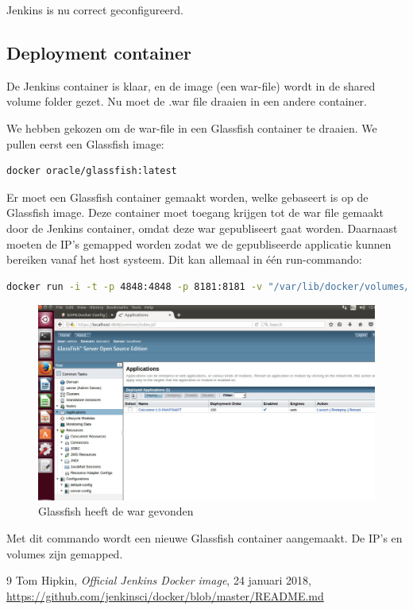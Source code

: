 \documentclass[12pt]{article}
\begin{document}
\noindent Jenkins is nu correct geconfigureerd.

\subsection{Deployment container}
\noindent De Jenkins container is klaar, en de image (een war-file) wordt in de shared volume folder gezet. Nu moet de .war file draaien in een andere container.

We hebben gekozen om de war-file in een Glassfish container te draaien. We pullen eerst een Glassfish image: 

\begin{lstlisting}[language=Bash]
docker oracle/glassfish:latest
\end{lstlisting}

\noindent Er moet een Glassfish container gemaakt worden, welke gebaseert is op de Glassfish image. Deze container moet toegang krijgen tot de war file gemaakt door de Jenkins container, omdat deze war gepubliseert gaat worden. Daarnaast moeten de IP's gemapped worden zodat we de gepubliseerde applicatie kunnen bereiken vanaf het host systeem. Dit kan allemaal in één run-commando:

\begin{lstlisting}[language=Bash]
docker run -i -t -p 4848:4848 -p 8181:8181 -v "/var/lib/docker/volumes/jenkins_home/_data/workspace/SOP6 Docker/target":/glassfish5/glassfish/domains/domain1/autodeploy oracle/glassfish:latest
\end{lstlisting}

\begin{figure}[H]
	\begin{center}
		\includegraphics[width=1.0\textwidth]{images/applications_glassfish.png}
		\caption{Glassfish heeft de war gevonden\label{fig:glassfish_application}}
	\end{center}
\end{figure}

\noindent Met dit commando wordt een nieuwe Glassfish container aangemaakt. De IP's en volumes zijn gemapped.

\begin{thebibliography}{9}
		Tom Hipkin,
		\textit{Official Jenkins Docker image},
		24 januari 2018,
		\url{https://github.com/jenkinsci/docker/blob/master/README.md}
\end{thebibliography}
\end{document}
